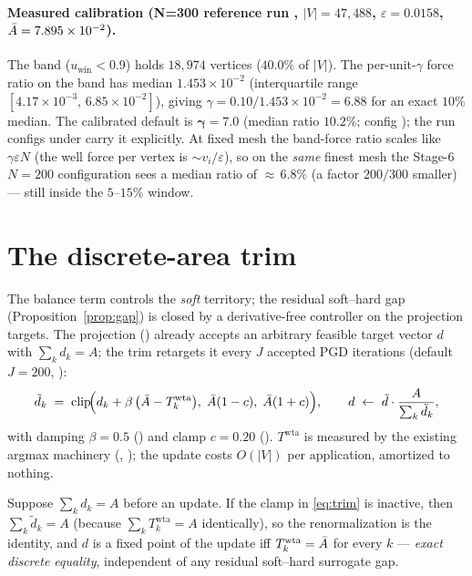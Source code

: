 \documentclass[11pt,a4paper]{article}
\begin{document}
\paragraph{Measured calibration (N=300 reference run
, $|V|=47{,}488$, $\varepsilon=0.0158$,
$\bar{A}=7.895\times10^{-2}$).}
The band ($u_{\mathrm{win}}<0.9$) holds $18{,}974$ vertices ($40.0\%$ of
$|V|$). The per-unit-$\gamma$ force ratio on the band has median
$1.453\times10^{-2}$ (interquartile range
$[4.17\times10^{-3},\,6.85\times10^{-2}]$), giving
$\gamma = 0.10/1.453\times10^{-2} = 6.88$ for an exact $10\%$ median. The
calibrated default is $\boldsymbol{\gamma = 7.0}$ (median ratio $10.2\%$;
config ); the run configs under
 carry it explicitly. At fixed mesh the band-force
ratio scales like $\gamma\varepsilon N$ (the well force per vertex is
$\sim v_i/\varepsilon$), so on the \emph{same} finest mesh the Stage-6
$N=200$ configuration sees a median ratio of ${\approx}\,6.8\%$
(a factor $200/300$ smaller) — still inside the $5$--$15\%$ window.

\section{The discrete-area trim}
\label{sec:trim}

The balance term controls the \emph{soft} territory; the residual soft--hard
gap (Proposition~\ref{prop:gap}) is closed by a derivative-free controller on
the projection targets. The projection
() already accepts an arbitrary
feasible target vector $d$ with $\sum_k d_k = A$; the trim retargets it every
$J$ accepted PGD iterations (default $J=200$,
):
\begin{equation}
  \tilde d_k \;=\; \operatorname{clip}\!\Bigl(
      d_k + \beta\,\bigl(\bar{A} - T^{\mathrm{wta}}_k\bigr),\;
      \bar{A}(1-c),\; \bar{A}(1+c)\Bigr),
  \qquad
  d \;\leftarrow\; \tilde d\cdot\frac{A}{\sum_k \tilde d_k},
  \label{eq:trim}
\end{equation}
with damping $\beta=0.5$ () and clamp $c=0.20$
(). $T^{\mathrm{wta}}$ is measured by the existing
argmax machinery (,
); the update costs $O(|V|)$ per
application, amortized to nothing.

\begin{prop}
\label{prop:trimfp}
Suppose $\sum_k d_k = A$ before an update. If the clamp in \eqref{eq:trim} is
inactive, then $\sum_k \tilde d_k = A$ (because
$\sum_k T^{\mathrm{wta}}_k = A$ identically), so the renormalization is the
identity, and $d$ is a fixed point of the update iff
$T^{\mathrm{wta}}_k = \bar{A}$ for every $k$ — \emph{exact discrete equality},
independent of any residual soft--hard surrogate gap.
\end{prop}
\end{document}
